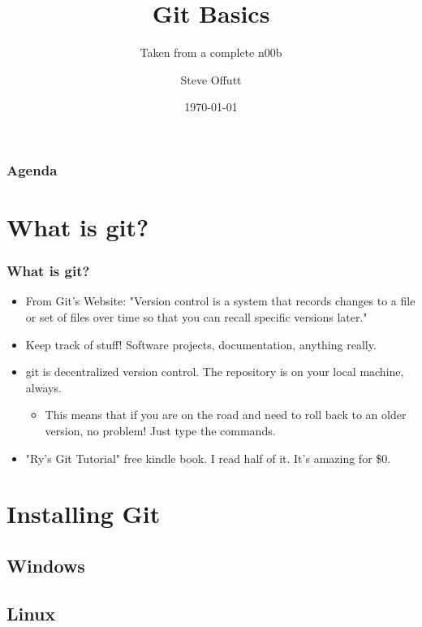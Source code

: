 \documentclass{beamer}
\title{Git Basics}
\subtitle{Taken from a complete n00b}
\author{Steve Offutt}
\institute{OSSEM}
\date{\today}
\begin{document}
\begin{frame}
    \titlepage
\end{frame}

\begin{frame}
    \frametitle{Agenda}
    \tableofcontents
\end{frame} 

\section{What is git?}
\begin{frame}
    \frametitle{What is git?}
    \begin{itemize}
        \item{From Git's Website:}
            "Version control is a system that records changes to a file or set of files over time so that you can recall specific versions later."
        \item{Keep track of stuff! Software projects, documentation, anything really.}
        \item{git is decentralized version control. The repository is on your local machine, always.}
            \begin{itemize}
                \item{This means that if you are on the road and need to roll back to an older version, no problem! Just type the commands.}
            \end{itemize}
        \item{"Ry's Git Tutorial" free kindle book. I read half of it. It's amazing for \$0.}
    \end{itemize}
\end{frame} 

\section{Installing Git}
\subsection{Windows}
\subsection{Linux}
\end{document}
